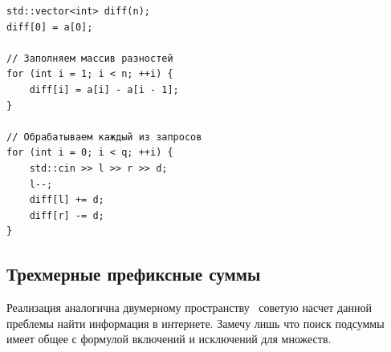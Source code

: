 \documentclass[a4paper,12pt]{article}
\begin{document}
\begin{verbatim}
std::vector<int> diff(n);
diff[0] = a[0];

// Заполняем массив разностей
for (int i = 1; i < n; ++i) {
    diff[i] = a[i] - a[i - 1];
}

// Обрабатываем каждый из запросов
for (int i = 0; i < q; ++i) {
    std::cin >> l >> r >> d;
    l--;
    diff[l] += d;
    diff[r] -= d;
}
\end{verbatim}

\subsection{Трехмерные префиксные суммы}
Реализация аналогична двумерному пространству \textendash\ советую насчет
данной преблемы найти информация в интернете. Замечу лишь что поиск подсуммы
имеет общее с формулой включений и исключений для множеств.
\end{document}
